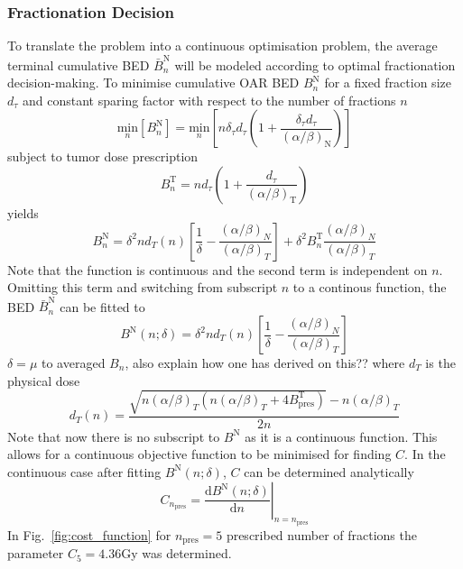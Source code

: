 \documentclass[\relativeRoot/ada.tex]{subfiles}
\begin{document}
\subsubsection{Fractionation Decision}
To translate the problem into a continuous optimisation problem, the average terminal cumulative BED $\bar{B}^{\text{N}}_n$ will be modeled according to optimal fractionation decision-making. To minimise cumulative OAR BED $B^{\text{N}}_n$ for a fixed fraction size $d_{\tau}$ and constant sparing factor with respect to the number of fractions $n$
\begin{equation*}
    \underset{n}{\text{min}} \left[ B^{\text{N}}_n \right] = \underset{n}{\text{min}} \left[ n \delta_\tau d_\tau( 1 +\frac{\delta_\tau d_\tau}{({\alpha}/{\beta})_\text{N}}) \right]
\end{equation*}
subject to tumor dose prescription
\begin{equation*}
    B^{\text{T}}_n = n d_\tau( 1 +\frac{d_\tau}{({\alpha}/{\beta})_\text{T}})
\end{equation*}
yields
\begin{equation*}
    B^{\text{N}}_n = \delta^2 n d_T(n) \left[ \frac{1}{\delta} - \frac{(\alpha / \beta) _N}{(\alpha / \beta)_T}\right] + \delta^2 B^{\text{T}}_n \frac{(\alpha / \beta) _N}{(\alpha / \beta)_T}
\end{equation*}
Note that the function is continuous and the second term is independent on $n$. Omitting this term and switching from subscript $n$ to a continous function, the BED $\bar{B}^{\text{N}}_n$ can be fitted to
\begin{equation}
    B^{\text{N}}(n; \delta) = \delta^2 n d_T(n) \left[ \frac{1}{\delta} - \frac{(\alpha / \beta) _N}{(\alpha / \beta)_T}\right]
\end{equation}
$\delta=\mu$ to averaged $B_n$, also explain how one has derived on this??
where $d_T$ is the physical dose
\begin{equation*}
    d_T(n) = \frac{\sqrt{n (\alpha / \beta)_T (n (\alpha / \beta)_T + 4 B_{\text{pres}}^{\text{T}})} - n (\alpha / \beta)_T}{2n}
\end{equation*}
Note that now there is no subscript to $B^{\text{N}}$ as it is a continuous function. This allows for a continuous objective function to be minimised for finding $C$. In the continuous case after fitting $B^{\text{N}}(n; \delta)$, $C$ can be determined analytically
\begin{equation*}
    C_{n_{\text{pres}}} = \left.\frac{\text{d} B^{\text{N}}(n; \delta)}{\text{d} n}\right|_{n=n_{\text{pres}}}
\end{equation*}
In Fig.~\ref{fig:cost_function} for $n_{\text{pres}}=5$ prescribed number of fractions the parameter $C_5=4.36$Gy was determined.
\end{document}
